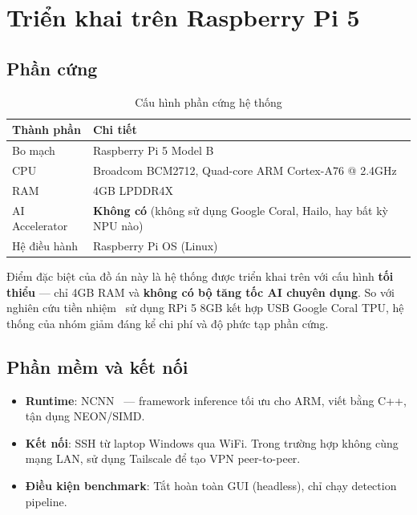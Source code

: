 \chapter{Triển khai trên Raspberry Pi 5}
\label{ch:deployment}

\section{Phần cứng}
\label{sec:deploy_hardware}

\begin{table}[H]
    \centering
    \caption{Cấu hình phần cứng hệ thống}
    \label{tab:hardware}
    \begin{tabularx}{\textwidth}{lX}
        \toprule
        \textbf{Thành phần} & \textbf{Chi tiết} \\
        \midrule
        Bo mạch       & Raspberry Pi 5 Model B \\
        CPU           & Broadcom BCM2712, Quad-core ARM Cortex-A76 @ 2.4GHz \\
        RAM           & 4GB LPDDR4X \\
        AI Accelerator & \textbf{Không có} (không sử dụng Google Coral, Hailo, hay bất kỳ NPU nào) \\
        Hệ điều hành  & Raspberry Pi OS (Linux) \\
        \bottomrule
    \end{tabularx}
\end{table}

Điểm đặc biệt của đồ án này là hệ thống được triển khai trên \rpi với cấu hình \textbf{tối thiểu} --- chỉ 4GB RAM và \textbf{không có bộ tăng tốc AI chuyên dụng}. So với nghiên cứu tiền nhiệm~\cite{kltn_tiennhiem} sử dụng RPi 5 8GB kết hợp USB Google Coral TPU, hệ thống của nhóm giảm đáng kể chi phí và độ phức tạp phần cứng.

\section{Phần mềm và kết nối}
\label{sec:deploy_software}

\begin{itemize}
    \item \textbf{Runtime}: NCNN~\cite{ncnn} --- framework inference tối ưu cho ARM, viết bằng C++, tận dụng NEON/SIMD.
    \item \textbf{Kết nối}: SSH từ laptop Windows qua WiFi. Trong trường hợp không cùng mạng LAN, sử dụng Tailscale để tạo VPN peer-to-peer.
    \item \textbf{Điều kiện benchmark}: Tắt hoàn toàn GUI (headless), chỉ chạy detection pipeline.
\end{itemize}

